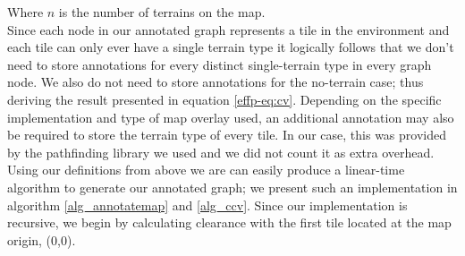 Where $n$ is the number of terrains on the map. \\ \newline
Since each node in our annotated graph represents a tile in the environment and each tile can only ever have a single terrain type it logically follows that we don't need to store annotations  for every distinct single-terrain type in every graph node. We also do not need to store annotations for the no-terrain case; thus deriving the result presented in equation \ref{effp-eq:cv}. Depending on the specific implementation and type of map overlay used, an additional annotation may also be required to store the terrain type of every tile. In our case, this was provided by the pathfinding library we used and we did not count it as extra overhead.\\ \newline
Using our definitions from above we are can easily produce a linear-time algorithm to generate our annotated graph; we present such an implementation in algorithm \ref{alg_annotatemap} and \ref{alg_ccv}. Since our implementation is recursive, we begin by calculating clearance with the first tile located at the map origin, (0,0).

